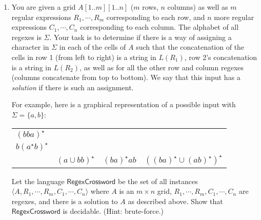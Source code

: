 \begin{enumerate}[resume]
\item \label{regex_crossword}  You are given a grid $A[1..m][1..n]$ ($m$ rows, $n$ columns) as well as $m$ regular expressions $R_1, \cdots, R_m$ corresponding to each row, and $n$ more regular expressions $C_1, \cdots, C_n$ corresponding to each column. The alphabet of all regexes is $\Sigma$. Your task is to determine if there is a way of assigning a character in $\Sigma$ in each of the cells of $A$ such that the concatenation of the cells in row 1 (from left to right) is a string in $L(R_1)$, row 2's concatenation is a string in $L(R_2)$, as well as for all the other row and column regexes (columns concatenate from top to bottom). We say that this input has a \emph{solution} if there is such an assignment. 

For example, here is a graphical representation of a possible input with $\Sigma = \{a, b\}$:

\begin{table}[!htbp]
	\centering
	\begin{tabular}{llll}
		\cline{2-4}
		\multicolumn{1}{l|}{$(bba)^\star$} & \multicolumn{1}{l|}{} & \multicolumn{1}{l|}{} & \multicolumn{1}{l|}{} \\ \cline{2-4} 
		\multicolumn{1}{l|}{$b(a^\star b)^\star$} & \multicolumn{1}{l|}{} & \multicolumn{1}{l|}{} & \multicolumn{1}{l|}{} \\ \cline{2-4} 
		&     $(a \cup bb)^\star$                 &       $(ba)^\star ab$                &   $((ba)^\star \cup (ab)^\star)^\star$                
	\end{tabular}
\end{table}

Let the language $\textsf{RegexCrossword}$ be the set of all instances $\langle A, R_1, \cdots, R_m, C_1, \cdots, C_n\rangle$ where $A$ is an $m \times n$ grid, $R_1, \cdots, R_m, C_1, \cdots, C_n$ are regexes, and there is a solution to $A$ as described above. Show that $\textsf{RegexCrossword}$ is decidable. (Hint: brute-force.)


\end{enumerate}